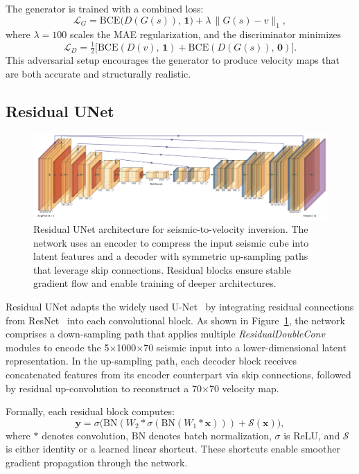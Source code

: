 \documentclass{article}
\begin{document}
  The generator is trained with a combined loss:
  \[
  \mathcal{L}_G = \mathrm{BCE}\bigl(D(G(s)),\,\mathbf{1}\bigr) + \lambda\,\lVert G(s) - v\rVert_1,
  \]
  where $\lambda = 100$ scales the MAE regularization, and the discriminator minimizes
  \[
  \mathcal{L}_D = \tfrac{1}{2}\bigl[\mathrm{BCE}(D(v),\,\mathbf{1}) + \mathrm{BCE}(D(G(s)),\,\mathbf{0})\bigr].
  \]
  This adversarial setup encourages the generator to produce velocity maps that are both accurate and structurally realistic.  



\subsection{Residual UNet}

\begin{figure}
    \centering
    \includegraphics[width=0.8\linewidth]{figures/ResidualUNet.png}
    \caption{Residual UNet architecture for seismic-to-velocity inversion. The network uses an encoder to compress the input seismic cube into latent features and a decoder with symmetric up-sampling paths that leverage skip connections. Residual blocks ensure stable gradient flow and enable training of deeper architectures.}
    \label{fig:residual_unet}
\end{figure}

Residual UNet adapts the widely used U-Net~\cite{ronneberger2015u} by integrating residual connections from ResNet~\cite{he2016deep} into each convolutional block. As shown in Figure~\ref{fig:residual_unet}, the network comprises a down-sampling path that applies multiple \emph{ResidualDoubleConv} modules to encode the 5×1000×70 seismic input into a lower-dimensional latent representation. In the up-sampling path, each decoder block receives concatenated features from its encoder counterpart via skip connections, followed by residual up-convolution to reconstruct a 70×70 velocity map.

Formally, each residual block computes:
\[
\mathbf{y} = \sigma\bigl(\mathrm{BN}(W_2 * \sigma(\mathrm{BN}(W_1 * \mathbf{x}))) + \mathcal{S}(\mathbf{x})\bigr),
\]
where \( * \) denotes convolution, \(\mathrm{BN}\) denotes batch normalization, \(\sigma\) is ReLU, and \(\mathcal{S}\) is either identity or a learned linear shortcut. These shortcuts enable smoother gradient propagation through the network.
\end{document}
